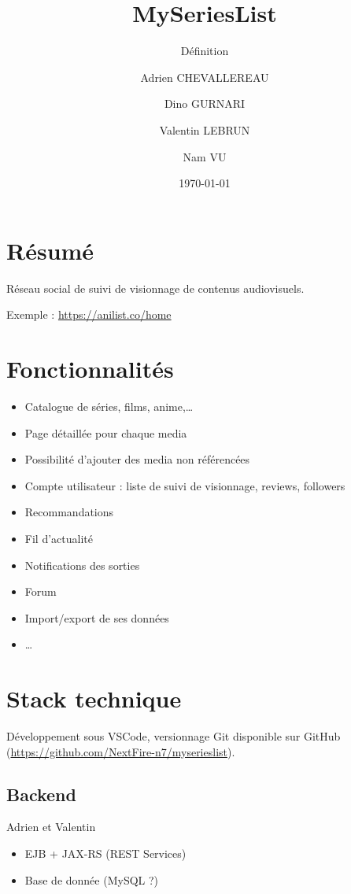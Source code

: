 \documentclass[headings=standardclasses,parskip=half]{scrartcl}
\title{MySeriesList}
\subtitle{Définition}
\author{Adrien CHEVALLEREAU \and Dino GURNARI \and Valentin LEBRUN \and Nam VU}
\date{\today}
\begin{document}
\maketitle

\section*{Résumé}

Réseau social de suivi de visionnage de contenus audiovisuels.

Exemple : \url{https://anilist.co/home}

\section*{Fonctionnalités}

\begin{itemize}
    \item Catalogue de séries, films, anime,\dots
    \item Page détaillée pour chaque media
    \item Possibilité d’ajouter des media non référencées
    \item Compte utilisateur : liste de suivi de visionnage, reviews, followers
    \item Recommandations
    \item Fil d'actualité
    \item Notifications des sorties
    \item Forum
    \item Import/export de ses données
    \item \dots
\end{itemize}

\section*{Stack technique}

Développement sous VSCode, versionnage Git disponible sur GitHub (\url{https://github.com/NextFire-n7/myserieslist}).

\subsection*{Backend}

Adrien et Valentin

\begin{itemize}
    \item EJB + JAX-RS (REST Services)
    \item Base de donnée (MySQL ?)
\end{itemize}
\end{document}
